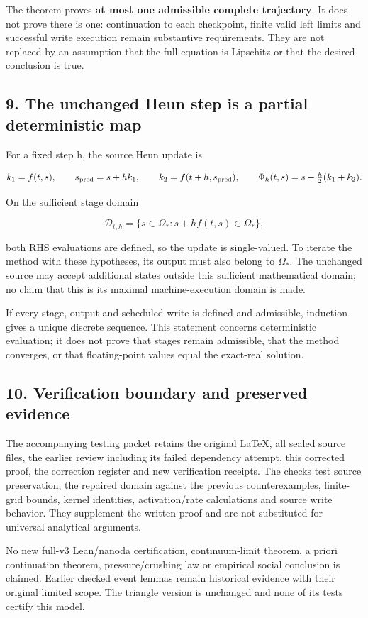 \documentclass[11pt,a4paper]{article}
\begin{document}
The theorem proves \textbf{at most one admissible complete trajectory}. It does not prove there is one: continuation to each checkpoint, finite valid left limits and successful write execution remain substantive requirements. They are not replaced by an assumption that the full equation is Lipschitz or that the desired conclusion is true.

\subsection*{9. The unchanged Heun step is a partial deterministic map}

For a fixed step h, the source Heun update is



\[
k_1=f(t,s),\qquad s_{\rm pred}=s+hk_1,\qquad
k_2=f(t+h,s_{\rm pred}),\qquad
\Phi_h(t,s)=s+\tfrac h2(k_1+k_2).
\]



On the sufficient stage domain



\[
\mathcal D_{t,h}=\{s\in\Omega_*:s+hf(t,s)\in\Omega_*\},
\]



both RHS evaluations are defined, so the update is single-valued. To iterate the method with these hypotheses, its output must also belong to \(\Omega_*\). The unchanged source may accept additional states outside this sufficient mathematical domain; no claim that this is its maximal machine-execution domain is made.

If every stage, output and scheduled write is defined and admissible, induction gives a unique discrete sequence. This statement concerns deterministic evaluation; it does not prove that stages remain admissible, that the method converges, or that floating-point values equal the exact-real solution.

\subsection*{10. Verification boundary and preserved evidence}

The accompanying testing packet retains the original LaTeX, all sealed source files, the earlier review including its failed dependency attempt, this corrected proof, the correction register and new verification receipts. The checks test source preservation, the repaired domain against the previous counterexamples, finite-grid bounds, kernel identities, activation/rate calculations and source write behavior. They supplement the written proof and are not substituted for universal analytical arguments.

No new full-v3 Lean/nanoda certification, continuum-limit theorem, a priori continuation theorem, pressure/crushing law or empirical social conclusion is claimed. Earlier checked event lemmas remain historical evidence with their original limited scope. The triangle version is unchanged and none of its tests certify this model.
\end{document}
